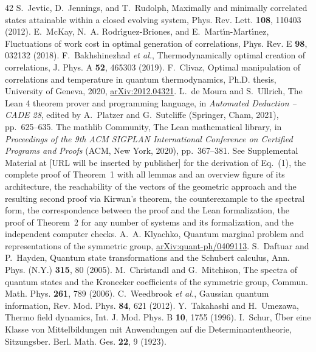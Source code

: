 \begin{thebibliography}{42}
 S.~Jevtic, D.~Jennings, and T.~Rudolph, Maximally and minimally correlated states attainable within a closed evolving system, Phys. Rev. Lett. \textbf{108}, 110403 (2012).
 E.~McKay, N.~A. Rodr\'{\i}guez-Briones, and E.~Mart\'{\i}n-Mart\'{\i}nez, Fluctuations of work cost in optimal generation of correlations, Phys. Rev. E \textbf{98}, 032132 (2018).
 F.~Bakhshinezhad \textit{et al.}, Thermodynamically optimal creation of correlations, J. Phys. A \textbf{52}, 465303 (2019).
 F.~Clivaz, Optimal manipulation of correlations and temperature in quantum thermodynamics, Ph.D. thesis, University of Geneva, 2020, \href{https://arxiv.org/abs/2012.04321}{arXiv:2012.04321}.
 L.~de Moura and S.~Ullrich, The Lean 4 theorem prover and programming language, in \textit{Automated Deduction -- CADE 28}, edited by A.~Platzer and G.~Sutcliffe (Springer, Cham, 2021), pp.~625--635.
 The mathlib Community, The Lean mathematical library, in \textit{Proceedings of the 9th ACM SIGPLAN International Conference on Certified Programs and Proofs} (ACM, New York, 2020), pp.~367--381.
 See Supplemental Material at [URL will be inserted by publisher] for the derivation of Eq.~(1), the complete proof of Theorem~1 with all lemmas and an overview figure of its architecture, the reachability of the vectors of the geometric approach and the resulting second proof via Kirwan's theorem, the counterexample to the spectral form, the correspondence between the proof and the Lean formalization, the proof of Theorem~2 for any number of systems and its formalization, and the independent computer checks.
 A.~A. Klyachko, Quantum marginal problem and representations of the symmetric group, \href{https://arxiv.org/abs/quant-ph/0409113}{arXiv:quant-ph/0409113}.
 S.~Daftuar and P.~Hayden, Quantum state transformations and the Schubert calculus, Ann. Phys. (N.Y.) \textbf{315}, 80 (2005).
 M.~Christandl and G.~Mitchison, The spectra of quantum states and the Kronecker coefficients of the symmetric group, Commun. Math. Phys. \textbf{261}, 789 (2006).
 C.~Weedbrook \textit{et al.}, Gaussian quantum information, Rev. Mod. Phys. \textbf{84}, 621 (2012).
 Y.~Takahashi and H.~Umezawa, Thermo field dynamics, Int. J. Mod. Phys. B \textbf{10}, 1755 (1996).
 I.~Schur, \"{U}ber eine Klasse von Mittelbildungen mit Anwendungen auf die Determinantentheorie, Sitzungsber. Berl. Math. Ges. \textbf{22}, 9 (1923).

\end{thebibliography}
